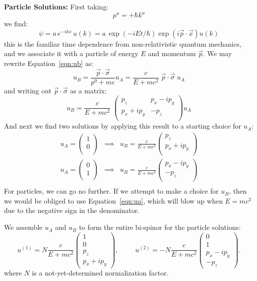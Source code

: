 \documentclass[12pt]{book}
\begin{document}
\noindent
{\bf Particle Solutions:  } First taking:
$$p^u = +\hbar k^u$$
we find:
$$\psi = a \, e^{-ikx} \, u(k) = a \, \exp(- iEt/\hbar) \exp(i\vec{p}\cdot\vec{x}) u(k)$$
this is the familiar time dependence from non-relativistic quantum mechanics, and we associate it with a particle of energy $E$ and momentum $\vec{p}$.  We may rewrite Equation~\ref{eqn:ub} as:
$$u_B = \frac{\vec{p}\cdot\vec{\sigma}}{p^0+mc} u_A = \frac{c}{E+mc^2} \; \vec{p}\cdot\vec{\sigma} \; u_A$$
and writing out $\vec{p}\cdot\vec{\sigma}$ as a matrix:
$$u_B = \frac{c}{E+mc^2} \; \begin{pmatrix} p_z & p_x - i p_y \\ p_x + i p_y & -p_z \\ \end{pmatrix} u_A
$$
And next we find two solutions by applying this result to a starting choice for $u_A$:
\begin{eqnarray*}
u_A = \begin{pmatrix} 1 \\ 0 \\ \end{pmatrix} &\implies& 
u_B = \frac{c}{E+mc^2} \begin{pmatrix} p_z \\ p_x + i p_y \\ \end{pmatrix}\\
u_A = \begin{pmatrix} 0 \\ 1 \\ \end{pmatrix} &\implies& 
u_B = \frac{c}{E+mc^2} \begin{pmatrix} p_x - i p_y \\ -p_z \\ \end{pmatrix}\\
\end{eqnarray*}
For particles, we can go no further.  If we attempt to make a choice for $u_B$, then we would be obliged to use Equation~\ref{eqn:ua}, which will blow up when $E=mc^2$ due to the negative sign in the denominator.

We assemble $u_A$ and $u_B$ to form the entire bi-spinor for the particle solutions:
$$u^{(1)} = N \frac{c}{E+mc^2} \begin{pmatrix} 1 \\ 0 \\ p_z \\ p_x + i p_y \end{pmatrix}, 
\hspace{1cm}
u^{(2)} = -N \frac{c}{E+mc^2} \begin{pmatrix} 0 \\ 1 \\ p_x - i p_y \\ -p_z \end{pmatrix}.
$$
where $N$ is a not-yet-determined normalization factor. 
\end{document}
